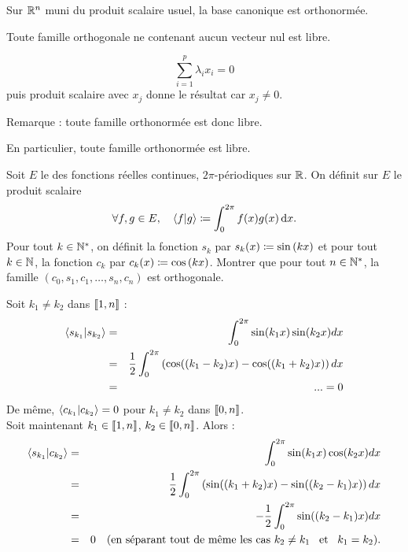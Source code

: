 \documentclass{magnolia}
\begin{document}
\begin{remarqueUnique}
\remarque Sur $\mathbb{R}^n$ muni du produit scalaire usuel, la base canonique est
  orthonormée.
\end{remarqueUnique}

\begin{proposition}[utile=-3]
Toute famille orthogonale ne contenant aucun vecteur nul est libre.
\end{proposition}

\begin{preuve}
$$\sum_{i=1}^p\lambda_i x_i=0$$ puis produit scalaire avec $x_j$ donne le résultat car $x_j\neq 0$.
\end{preuve}

\begin{sol}
Remarque : toute famille orthonormée est donc libre.
\end{sol}

\begin{remarqueUnique}
\remarque En particulier, toute famille orthonormée est libre.
\end{remarqueUnique}

\begin{exoUnique}
\exo Soit $E$ le \Rev des fonctions réelles continues, $2\pi$-périodiques sur $\mathbb{R}$.
  On définit sur $E$ le produit scalaire
  \[\forall f,g\in E ,\quad \left\langle {f}\middle|{g}\right\rangle\coloneqq\int_{0}^{2\pi} f(x)g(x)\,\text{d}x.\]
  Pour tout $k\in{\mathbb{N}^*}$, on définit la fonction $s_k$ par
  $s_k(x)\coloneqq\sin\left(kx\right)$ et pour tout $k\in\mathbb{N}$, la fonction $c_k$ par
  $c_k(x)\coloneqq\cos\left(kx\right)$. Montrer que pour tout $n\in{\mathbb{N}^*}$, la famille
  $(c_0,s_1,c_1,\ldots,s_n,c_n)$ est orthogonale.
\end{exoUnique}

\begin{sol}
Soit $k_1\neq k_2$ dans $\left\llbracket 1,n\right\rrbracket$ :
\begin{eqnarray*}
\left\langle {s_{k_1}}\middle|{s_{k_2}}\right\rangle&=&\int_{0}^{2\pi}\sin(k_1 x)\sin(k_2 x) dx \\
&=& \frac{1}{2}\int_{0}^{2\pi}\left(\cos((k_1-k_2)x)-\cos((k_1+k_2)x)\right) dx\\
&=&...=0
\end{eqnarray*}
De même, $\left\langle {c_{k_1}}\middle|{c_{k_2}}\right\rangle=0$ pour $k_1\neq k_2$ dans $\left\llbracket 0,n\right\rrbracket$.\\
Soit maintenant $k_1\in \left\llbracket 1,n\right\rrbracket$, $k_2\in\left\llbracket 0,n\right\rrbracket$. Alors : 
\begin{eqnarray*}
\left\langle {s_{k_1}}\middle|{c_{k_2}}\right\rangle&=&\int_{0}^{2\pi}\sin(k_1 x)\cos(k_2 x) dx \\
&=& \frac{1}{2}\int_{0}^{2\pi}\left(\sin((k_1+k_2)x)-\sin((k_2-k_1)x)\right) dx\\
&=&-\frac{1}{2}\int_{0}^{2\pi}\sin((k_2-k_1)x) dx\\
&=&0 \quad (\text{en séparant tout de même les cas } k_2\neq k_1 \quad\!\text{et}\quad\! k_1=k_2).
\end{eqnarray*}

\end{sol}
\end{document}
